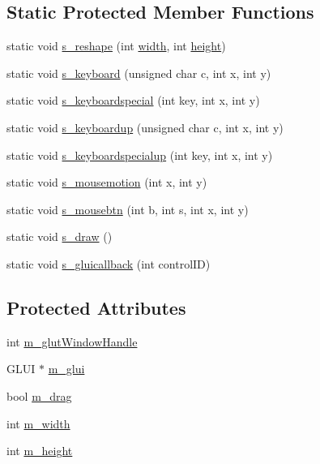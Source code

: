\subsection*{Static Protected Member Functions}
\begin{DoxyCompactItemize}
\item 
static void \hyperlink{classBaseGfxApp_a5fe6a77d37044cbe28647ed3391bbb7a}{s\-\_\-reshape} (int \hyperlink{classBaseGfxApp_ace089a1a94fb6bb0bc17e1b7fa48e05d}{width}, int \hyperlink{classBaseGfxApp_aa253dbe16a20c40e0a1bf8ff942ceea3}{height})
\item 
static void \hyperlink{classBaseGfxApp_a52edb2569227319feb68779844e7d857}{s\-\_\-keyboard} (unsigned char c, int x, int y)
\item 
static void \hyperlink{classBaseGfxApp_a1e8d90a4faab60300ddf2a4ea9b83115}{s\-\_\-keyboardspecial} (int key, int x, int y)
\item 
static void \hyperlink{classBaseGfxApp_aa1ca205af9d6cee33949f2e6adf4c923}{s\-\_\-keyboardup} (unsigned char c, int x, int y)
\item 
static void \hyperlink{classBaseGfxApp_a0e4dfe006f3cc9126c1cc8ad32784f75}{s\-\_\-keyboardspecialup} (int key, int x, int y)
\item 
static void \hyperlink{classBaseGfxApp_a5e640f2394f7e038d0dd2b469d5c2e24}{s\-\_\-mousemotion} (int x, int y)
\item 
static void \hyperlink{classBaseGfxApp_a22dd953bfb75add9fd0f8f2f8be535c5}{s\-\_\-mousebtn} (int b, int s, int x, int y)
\item 
static void \hyperlink{classBaseGfxApp_a58415c6151a2a80e1fe2eaa9919a4dab}{s\-\_\-draw} ()
\item 
static void \hyperlink{classBaseGfxApp_ad4a963321f1147d68369225ab0c7f32f}{s\-\_\-gluicallback} (int control\-I\-D)
\end{DoxyCompactItemize}
\subsection*{Protected Attributes}
\begin{DoxyCompactItemize}
\item 
int \hyperlink{classBaseGfxApp_ad8697d6fdd10e6f336c3a662016b4fa7}{m\-\_\-glut\-Window\-Handle}
\item 
G\-L\-U\-I $\ast$ \hyperlink{classBaseGfxApp_a6eb1673b80283727221da2242211af1d}{m\-\_\-glui}
\item 
bool \hyperlink{classBaseGfxApp_a2e70a389224f8affe7c137f7e20dc8c1}{m\-\_\-drag}
\item 
int \hyperlink{classBaseGfxApp_a7e5ef1c8f25fe081b4a1fd4ce6a96e07}{m\-\_\-width}
\item 
int \hyperlink{classBaseGfxApp_ac078e4fc20b5c2fe0c744966b850b412}{m\-\_\-height}
\end{DoxyCompactItemize}
